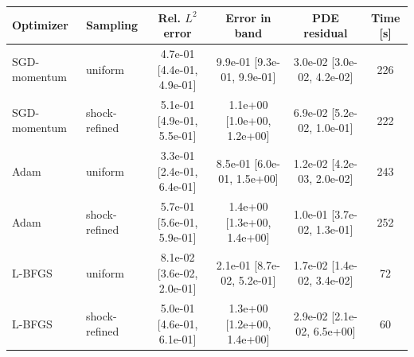 \begin{tabular}{llcccc}
\toprule
Optimizer & Sampling & Rel. $L^2$ error & Error in band & PDE residual & Time [s] \\
\midrule
SGD-momentum & uniform & 4.7e-01 [4.4e-01, 4.9e-01] & 9.9e-01 [9.3e-01, 9.9e-01] & 3.0e-02 [3.0e-02, 4.2e-02] & 226 \\
SGD-momentum & shock-refined & 5.1e-01 [4.9e-01, 5.5e-01] & 1.1e+00 [1.0e+00, 1.2e+00] & 6.9e-02 [5.2e-02, 1.0e-01] & 222 \\
\midrule
Adam & uniform & 3.3e-01 [2.4e-01, 6.4e-01] & 8.5e-01 [6.0e-01, 1.5e+00] & 1.2e-02 [4.2e-03, 2.0e-02] & 243 \\
Adam & shock-refined & 5.7e-01 [5.6e-01, 5.9e-01] & 1.4e+00 [1.3e+00, 1.4e+00] & 1.0e-01 [3.7e-02, 1.3e-01] & 252 \\
\midrule
L-BFGS & uniform & 8.1e-02 [3.6e-02, 2.0e-01] & 2.1e-01 [8.7e-02, 5.2e-01] & 1.7e-02 [1.4e-02, 3.4e-02] & 72 \\
L-BFGS & shock-refined & 5.0e-01 [4.6e-01, 6.1e-01] & 1.3e+00 [1.2e+00, 1.4e+00] & 2.9e-02 [2.1e-02, 6.5e+00] & 60 \\
\bottomrule
\end{tabular}